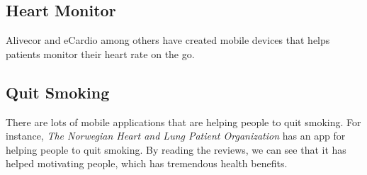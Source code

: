 \subsection{Heart Monitor}
Alivecor and eCardio among others have created mobile devices that helps patients monitor their heart rate on the go. 

\subsection{Quit Smoking}
There are lots of mobile applications that are helping people to quit smoking. For instance, \emph{The Norwegian Heart and Lung Patient Organization} has an app for helping people to quit smoking. By reading the reviews, we can see that it has helped motivating people, which has tremendous health benefits. 

